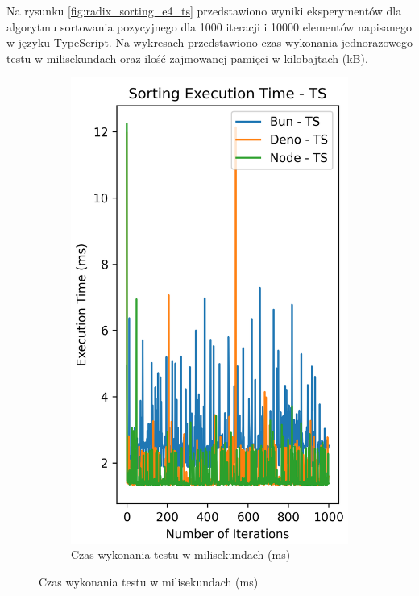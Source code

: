 Na rysunku \ref{fig:radix_sorting_e4_ts} przedstawiono wyniki eksperymentów dla algorytmu sortowania pozycyjnego dla 1000 iteracji i 10000 elementów napisanego w języku TypeScript. Na wykresach przedstawiono czas wykonania jednorazowego testu w milisekundach oraz ilość zajmowanej pamięci w kilobajtach (kB).

\begin{figure}[H]
  \centering
  \begin{subfigure}[b]{0.42\textwidth}
    \centering
    \includegraphics[width=\textwidth]{Figures/sorting/sorting_radix_1000_10000_ts_time.png}
    \caption{Czas wykonania testu w milisekundach (ms)}

\end{subfigure}
\end{figure}
